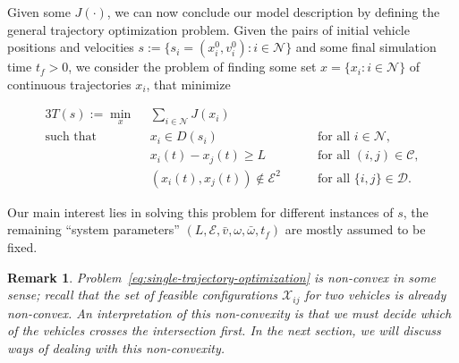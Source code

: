 \documentclass[a4paper]{report}
\theoremstyle{definition}
\theoremstyle{plain}
\newtheorem*{remark}{Remark}
\begin{document}
Given some $J(\cdot)$, we can now conclude our model description by defining the
general trajectory optimization problem.
%
Given the pairs of initial vehicle positions and velocities
$s := \{s_{i} = (x_{i}^{0}, v_{i}^{0}) : i \in \mathcal{N} \}$ and some final
simulation time $t_{f} > 0$, we consider the problem of finding some set
$x = \{ x_{i} : i \in \mathcal{N} \}$ of continuous trajectories $x_{i}$, that
minimize
%
\begin{mdframed}
\vspace{-\abovedisplayskip}
\begin{alignat}{3}\label{eq:single-trajectory-optimization}
  T(s) := \min_{x} \;\, & \sum_{i \in \mathcal{N}} J(x_{i}) \tag{T} \\
  \text{such that } \; & x_{i} \in D(s_{i}) && \quad \text{ for all } i \in \mathcal{N} , \tag{T.1} \label{eq:T1} \\
           & x_{i}(t) - x_{j}(t) \geq L && \quad \text{ for all } (i,j) \in \mathcal{C} , \tag{T.2} \label{eq:T2}\\
           & (x_{i}(t), x_{j}(t)) \notin \mathcal{E}^{2} && \quad\text{ for all } \{i, j\} \in \mathcal{D} . \tag{T.3} \label{eq:T3}
\end{alignat}
\end{mdframed}
Our main interest lies in solving this problem for different instances of $s$, the
remaining ``system parameters''
$(L,\mathcal{E}, \bar{v}, \omega, \bar{\omega}, t_{f})$ are mostly assumed to be
fixed.

\begin{remark}
Problem~\eqref{eq:single-trajectory-optimization} is non-convex in some sense;
recall that the set of feasible configurations $\mathcal{X}_{ij}$ for two
vehicles is already non-convex.
%
An interpretation of this non-convexity is that we must decide which of the
vehicles crosses the intersection first.
%
In the next section, we will discuss ways of dealing with this non-convexity.
\end{remark}
\end{document}
